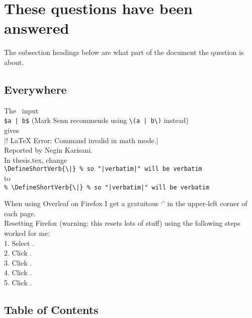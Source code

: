 \section{These questions have been answered}

The subsection headings below are what part of the document
the question is about.


\subsection*{Everywhere}
The \LaTeXLogo\ input\\
 \verb+$a | b$+\qquad
(Mark Senn recommends using \verb+\(a | b\)+ instead)\\
gives\\
 |! LaTeX Error: Command \ttfamily invalid in math mode.|\\
Reported by Negin Karisani.\\
\MyA
In thesis.tex, change\\
 \verb+\DefineShortVerb{\|} % so "|verbatim|" will be verbatim+\\
to\\
 \verb+% \DefineShortVerb{\|} % so "|verbatim|" will be verbatim+


When using Overleaf on Firefox
I get a gratuitous `\Box'
in the upper-left corner of each page.\\
\MyA
Resetting Firefox
(warning: this resets lots of stuff)
using the following steps
worked for me:\\
 1. Select .\\
 2. Click .\\
 3. Click .\\
 4. Click .\\
 5. Click .


\subsection*{Table of Contents}

